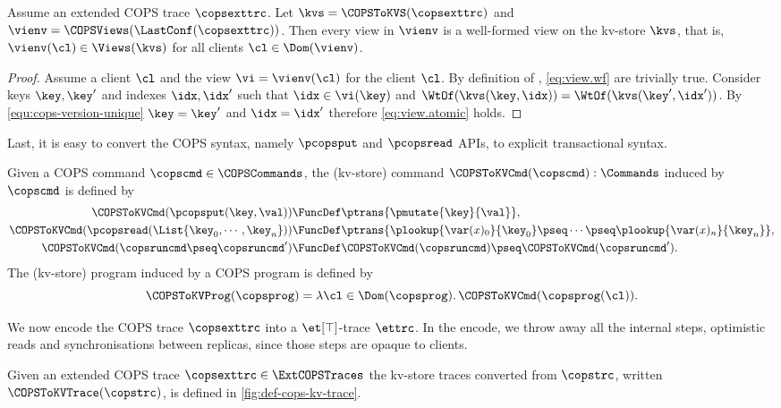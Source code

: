 \begin{proposition}
Assume an extended COPS trace \( \copsexttrc \).
Let \( \kvs = \COPSToKVS(\copsexttrc) \) and \( \vienv = \COPSViews(\LastConf(\copsexttrc)) \).
Then every view in \( \vienv \) is a well-formed view on the kv-store \( \kvs \),
that is, \( \vienv(\cl) \in \Views(\kvs) \) for all clients \( \cl \in \Dom(\vienv) \).
\end{proposition}
\begin{proof}
Assume a client \( \cl \) and the view \( \vi = \vienv(\cl) \) for the client \( \cl \).
By definition of \COPSViews, \cref{eq:view.wf} are trivially true.
Consider keys \( \key,\key' \) and indexes \( \idx,\idx' \) 
such that \( \idx \in \vi(\key) \) and \( \WtOf(\kvs(\key,\idx)) = \WtOf(\kvs(\key',\idx')) \).
By \cref{equ:cops-version-unique} \( \key = \key' \) and \( \idx = \idx' \)
therefore \cref{eq:view.atomic} holds.
\end{proof}

Last, it is easy to convert the COPS syntax, namely \( \pcopsput\) and \( \pcopsread \) APIs,
to explicit transactional syntax.

\begin{definition}
Given a COPS command \( \copscmd \in \COPSCommands \),
the (kv-store) command \( \COPSToKVCmd(\copscmd) : \Commands \) induced by \( \copscmd \) is defined by
\begin{align*}
   \COPSToKVCmd(\pcopsput(\key,\val)) & \FuncDef \ptrans{ \pmutate{\key}{\val} } ,
\\ \COPSToKVCmd(\pcopsread(\List{\key_0, \cdots, \key_n })) 
        & \FuncDef \ptrans{ \plookup{\var(x)_0}{\key_0} \pseq \cdots \pseq \plookup{\var(x)_n}{\key_n}  } ,
\\ \COPSToKVCmd(\copsruncmd \pseq \copsruncmd' ) 
        & \FuncDef \COPSToKVCmd(\copsruncmd) \pseq \COPSToKVCmd(\copsruncmd') .
\end{align*}                                                                 
The (kv-store) program induced by a COPS program is defined by
\[
    \COPSToKVProg(\copsprog) = \lambda \cl \in \Dom(\copsprog) \ldotp \COPSToKVCmd(\copsprog(\cl)) .
\]
\end{definition}

We now encode the COPS trace \( \copsexttrc \) into a \( \et[\top]\)-trace \( \ettrc \).
In the encode, we throw away all the internal steps, optimistic reads and synchronisations between replicas,
since those steps are opaque to clients.
\begin{definition}
\label{def:cops-kv-store-trace}
Given an extended COPS trace \( \copsexttrc \in \ExtCOPSTraces \)
the kv-store traces converted from \( \copstrc \),
written \( \COPSToKVTrace(\copstrc) \), is defined in \cref{fig:def-cops-kv-trace}.
\end{definition}

